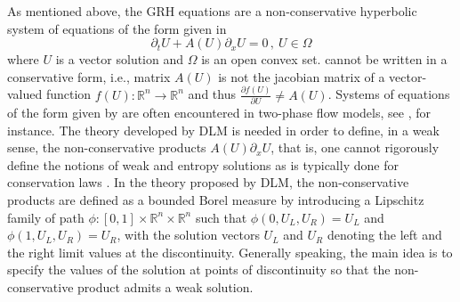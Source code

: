 \documentclass[times,doublespace]{fldauth}%
\begin{document}
As mentioned above, the GRH equations are a  non-conservative hyperbolic system of equations of the form given in  
%
\begin{equation}\label{eq:nc-syst-eq}
\partial_t U + A(U) \partial_x U = 0 \, ,\ U \in \Omega
\end{equation}
%
where $U$ is a vector solution and $\Omega$ is an open convex set.  cannot be written in a conservative form, i.e., matrix $A(U)$ is not the jacobian matrix of a vector-valued function $f(U): \mathbb{R}^n \to \mathbb{R}^n$ and thus $\frac{\partial f(U)}{\partial U} \ne A(U)$.  
Systems of equations of the form given by   are often encountered in two-phase flow models, see 
\cite{Saurel_2009, Ambroso_2012, Zein_2010, Li_2004, Saurel_2001b, Saurel_2001a, GuillardMurrone2003}, for instance. 
The theory developed by DLM \cite{dlm} is needed in order to define, in a weak sense, the non-conservative products $A(U) \partial_x U$,
that is, one cannot rigorously define the notions of weak and entropy solutions as is typically done for 
conservation laws \cite{Lax}. In the theory proposed by DLM, the non-conservative products are defined as a bounded Borel 
measure by introducing a Lipschitz family of path $\phi: [0,1] \times \mathbb{R}^n \times \mathbb{R}^n$ such that 
$\phi(0, U_L, U_R) = U_L$ and $\phi(1, U_L, U_R) = U_R$, with the solution vectors $U_L$ and $U_R$ denoting the left and the right limit values at the discontinuity. 
Generally speaking, the main idea is to specify the values of the solution at points of discontinuity so that the non-conservative product admits a weak solution.
%
\end{document}
